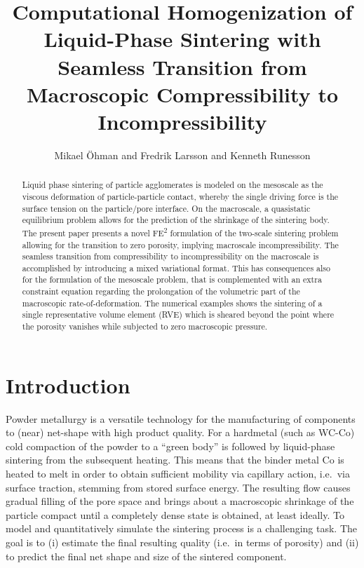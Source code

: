 \documentclass[12pt,review]{elsarticle}
\title{Computational Homogenization of Liquid-Phase Sintering with Seamless Transition from Macroscopic Compressibility to Incompressibility}
\author{Mikael \"Ohman and Fredrik Larsson and Kenneth Runesson}
\begin{document}
\maketitle


\begin{abstract}
\noindent
Liquid phase sintering of particle agglomerates is modeled on the mesoscale as the viscous deformation of particle-particle contact, whereby the single driving force is the surface tension on the particle/pore interface.
On the macroscale, a quasistatic equilibrium problem allows for the prediction of the shrinkage of the sintering body.
The present paper presents a novel FE\textsuperscript{2} formulation of the two-scale sintering problem allowing for the transition to zero porosity, implying macroscale incompressibility.
The seamless transition from compressibility to incompressibility on the macroscale is accomplished by introducing a mixed variational format.
This has consequences also for the formulation of the mesoscale problem, that is complemented with an extra constraint equation regarding the prolongation of the volumetric part of the macroscopic rate-of-deformation.
The numerical examples shows the sintering of a single representative volume element (RVE) which is sheared beyond the point where the porosity vanishes while subjected to zero macroscopic pressure.
\end{abstract}

\section{Introduction}
Powder metallurgy is a versatile technology for the manufacturing of components to (near) net-shape with high product quality.
For a hardmetal (such as WC-Co) cold compaction of the powder to a ``green body'' is followed by liquid-phase sintering from the subsequent heating.
This means that the binder metal Co is heated to melt in order to obtain sufficient mobility via capillary action, i.e.\ via surface traction, stemming from stored surface energy.
The resulting flow causes gradual filling of the pore space and brings about a macroscopic shrinkage of the particle compact until a completely dense state is obtained, at least ideally.
To model and quantitatively simulate the sintering process is a challenging task.
The goal is to (i) estimate the final resulting quality (i.e.\ in terms of porosity) and (ii) to predict the final net shape and size of the sintered component.
\end{document}
